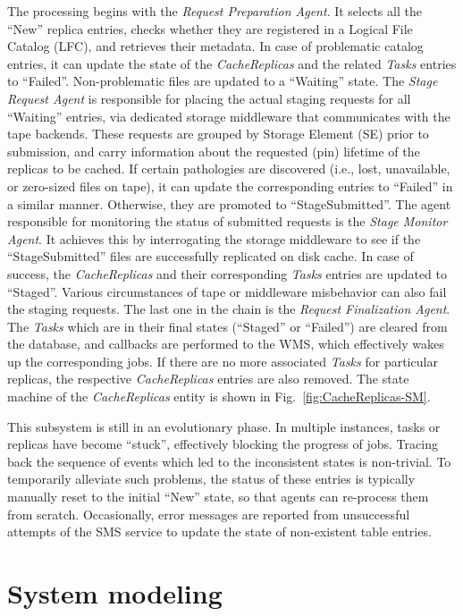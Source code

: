 \documentclass[sort&compress,preprint,3p]{elsarticle}
\begin{document}
The processing begins with the \textit{Request Preparation Agent}. It selects all the
``New'' replica entries, checks whether they are registered in a Logical
File Catalog (LFC), and retrieves their metadata. In case of problematic catalog
entries, it can update the state of the \textit{CacheReplicas} and the related \textit{Tasks}
entries to ``Failed''. Non-problematic files are updated to a
``Waiting'' state. The \textit{Stage Request Agent} is responsible for placing the actual staging
requests for all ``Waiting'' entries, via dedicated storage middleware that
communicates with the tape backends. These requests are grouped by Storage Element (SE) prior to
submission, and carry information about the requested (pin) lifetime of the
replicas to be cached. If certain pathologies are discovered (i.e., lost,
unavailable, or zero-sized files on tape), it can update the corresponding
entries to ``Failed'' in a similar manner. Otherwise, they are promoted to
``StageSubmitted''. The agent responsible for monitoring the status of submitted
requests is the \textit{Stage Monitor Agent}. It achieves this by interrogating the
storage middleware to see if the ``StageSubmitted'' files are successfully
replicated on disk cache. In case of success, the \textit{CacheReplicas} and their
corresponding \textit{Tasks} entries are updated to ``Staged''. Various circumstances of
tape or middleware misbehavior can also fail the staging requests. The last one
in the chain is the \textit{Request Finalization Agent}. The \textit{Tasks} which are in their
final states (``Staged'' or ``Failed'') are cleared from the database, and callbacks
are performed to the WMS, which effectively wakes up the corresponding jobs. If
there are no more associated \textit{Tasks} for particular replicas, the respective
\textit{CacheReplicas} entries are also removed. The state machine of the \textit{CacheReplicas}
entity is shown in Fig.~\ref{fig:CacheReplicas-SM}.

This subsystem is still in an evolutionary phase. In multiple instances, tasks or
replicas have become “stuck”, effectively blocking the progress of jobs. Tracing
back the sequence of events which led to the inconsistent states is non-trivial.
To temporarily alleviate such problems, the status of these entries is typically manually
reset to the initial ``New'' state, so that agents can re-process them from
scratch. Occasionally, error messages are reported from unsuccessful attempts of
the SMS service to update the state of non-existent table entries.

\section{System modeling}
\end{document}
